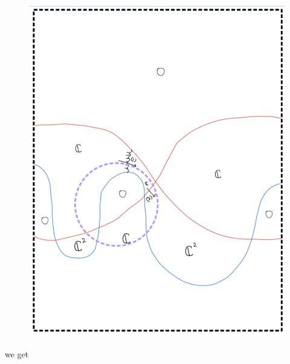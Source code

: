 \begin{enumerate}[label=(Step \arabic*)]
\begin{figure}[H]
    \centering
    \includegraphics[scale = 0.85]{diagrams/cobord8/10.png}
    \caption{}
    \label{fig:your-label}
\end{figure}
\pagebreak
we get


\end{enumerate}
